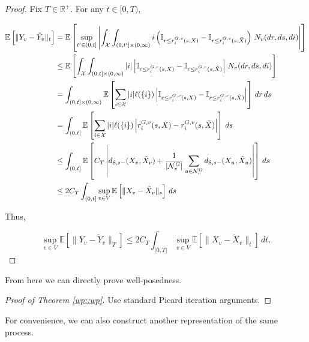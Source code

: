 \documentclass[12pt]{article}
\newcommand{\mb}{\mathbb}
\newcommand{\mc}{\mathcal}
\newcommand{\te}{\text}
\newcommand{\ex}[1]{\mb{E}\left[#1\right]}			%
\newcommand{\sta}{\mc{X}}							%
\newcommand{\gneigh}[2]{\mc{N}^{#1}_{#2}}			%
\newcommand{\Xf}{X}									%
\newcommand{\poiss}{N}								%
\newcommand{\Sm}{\ell}								%
\newcommand{\rate}{r}								%
\newcommand{\stmet}[1]{
\ifstrempty{#1}{
	d_{\te{S}}}{
	d_{\te{S},#1}}}									%
\newcommand{\poissv}[1]{_{#1}}						%
\newcommand{\vind}[1]{_{#1}}						%
\newcommand{\stpara}[1]{_{#1}}						%
\newcommand{\tpara}[1]{_{#1}}						%
\newcommand{\gvpara}[2]{^{#1,#2}}					%
\newcommand{\jumpbd}[1]{C_{#1}}						%
\newcommand{\tmepro}[2]{(#1,#2)}					%
\newcommand{\Xg}{Y}									%
\newcommand{\alt}[1]{\tilde{#1}}					%
\begin{document}
\begin{proof}
Fix \(T \in \mb{R}^+\). For any \(t \in [0,T)\),

\begin{align*}
\ex{\|\Xg\vind{v} - \alt{\Xg}\vind{v}\|\tpara{t}} &= \ex{\sup_{t' \in (0,t]}\left|\int_\sta\int_{(0,t']\times (0,\infty)} i\left(\mb{I}_{r \leq \rate\gvpara{G}{v}\stpara{i}\tmepro{s}{\Xf}} - \mb{I}_{r \leq \rate\gvpara{G}{v}\stpara{i}\tmepro{s}{\alt{\Xf}}}\right)\,\poiss\poissv{v}(dr,ds,di)\right|}\\
&\leq \ex{\int_\sta\int_{(0,t]\times (0,\infty)} |i|\left|\mb{I}_{r \leq \rate\gvpara{G}{v}\stpara{i}\tmepro{s}{\Xf}} - \mb{I}_{r \leq \rate\gvpara{G}{v}\stpara{i}\tmepro{s}{\alt{\Xf}}}\right|\,\poiss\poissv{v}(dr,ds,di)}\\
&= \int_{(0,t]\times (0,\infty)}\ex{\sum_{i\in \sta}|i|\Sm(\{i\})\left|\mb{I}_{r \leq \rate\gvpara{G}{v}\stpara{i}\tmepro{s}{\Xf}} - \mb{I}_{r \leq \rate\gvpara{G}{v}\stpara{i}\tmepro{s}{\alt{\Xf}}}\right|}\,dr\,ds\\
&= \int_{(0,t]}\ex{\sum_{i\in \sta}|i|\Sm(\{i\})\left|\rate\gvpara{G}{v}\stpara{i}\tmepro{s}{\Xf} - \rate\gvpara{G}{v}\stpara{i}\tmepro{s}{\alt{\Xf}}\right|}\,ds\\
&\leq \int_{(0,t]}\ex{\jumpbd{T}\left|\stmet{s-}(\Xf\vind{v},\alt{\Xf}\vind{v}) + \frac{1}{|\gneigh{G}{v}|}\sum_{u\in \gneigh{G}{v}} \stmet{s-}(\Xf\vind{u},\alt{\Xf}\vind{u}) \right|}\,ds\\
&\leq 2\jumpbd{T} \int_{(0,t]} \sup_{v \in V} \ex{\|\Xf\vind{v} - \alt{\Xf}\vind{v}\|\tpara{s}}\,ds
\end{align*}

Thus,

\[\sup_{v\in V}\ex{\|\Xg\vind{v} - \alt{\Xg}\vind{v}\|\tpara{T}} \leq 2\jumpbd{T} \int_{(0,T]} \sup_{v \in V} \ex{\|\Xf\vind{v} - \alt{\Xf}\vind{v}\|\tpara{t}}\,dt.\]
\end{proof}

From here we can directly prove well-posedness.

\begin{proof}[Proof of Theorem \ref{wp::wp}]
Use standard Picard iteration arguments.
\end{proof}

For convenience, we can also construct another representation of the same process.
\end{document}
